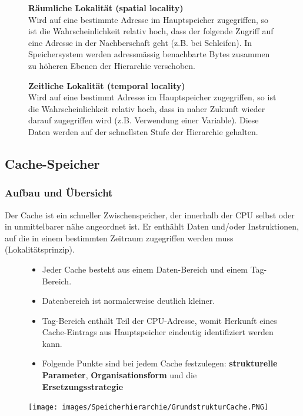 \begin{figure}[ht]
	\begin{minipage}[t]{0.475\textwidth}
		\textbf{Räumliche Lokalität (spatial locality)}\\
		Wird auf eine bestimmte Adresse im Hauptspeicher zugegriffen, so ist die Wahrscheinlichkeit relativ hoch, dass der folgende Zugriff auf eine Adresse in der Nachberschaft geht (z.B. bei Schleifen).
		In Speichersystem werden adressmässig benachbarte Bytes zusammen zu höheren Ebenen der Hierarchie verschoben.
	\end{minipage}
	\hfill
	\begin{minipage}[t]{0.475\textwidth}
		\textbf{Zeitliche Lokalität (temporal locality)}\\
		Wird auf eine bestimmt Adresse im Hauptspeicher zugegriffen, so ist die Wahrscheinlichkeit relativ hoch, dass in naher Zukunft wieder darauf zugegriffen wird (z.B. Verwendung einer Variable).
		Diese Daten werden auf der schnellsten Stufe der Hierarchie gehalten.
	\end{minipage}	
\end{figure}

\subsection{Cache-Speicher}

\subsubsection{Aufbau und Übersicht}
Der Cache ist ein schneller Zwischenspeicher, der innerhalb der CPU selbst oder in unmittelbarer nähe angeordnet ist.
Er enthählt Daten und/oder Instruktionen, auf die in einem bestimmten Zeitraum zugegriffen werden muss (Lokalitätsprinzip).

\begin{figure}[htbp]
	
	\begin{minipage}{0.5\textwidth}		
		\begin{itemize}[noitemsep,topsep=0pt]
			\item Jeder Cache besteht aus einem Daten-Bereich und einem Tag-Bereich.
			\item Datenbereich ist normalerweise deutlich kleiner.
			\item Tag-Bereich enthält Teil der CPU-Adresse, womit Herkunft eines Cache-Eintrags aus Hauptspeicher eindeutig identifiziert werden kann.
			\item Folgende Punkte sind bei jedem Cache festzulegen: \textbf{strukturelle Parameter}, \textbf{Organisationsform} und die \textbf{Ersetzungsstrategie}
		\end{itemize}	
	\end{minipage}
	\hfill		
	\begin{minipage}{0.45\textwidth} 
		\texttt{[image: images/Speicherhierarchie/GrundstrukturCache.PNG]}
	\end{minipage}
	
\end{figure}

